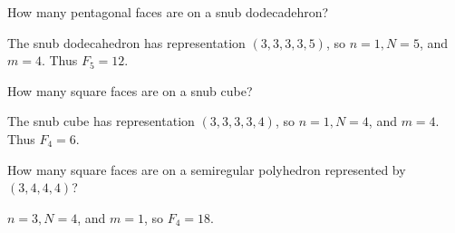 \documentclass[twoside,10pt]{article}
\begin{document}
\begin{exer}[5.17]
How many pentagonal faces are on a snub dodecadehron?
\end{exer}

The snub dodecahedron has representation $(3,3,3,3,5)$, so $n=1,N=5$, and $m=4$. Thus $F_{5} = 12$.

\begin{exer}[5.18]
How many square faces are on a snub cube?
\end{exer}

The snub cube has representation $(3,3,3,3,4)$, so $n=1,N=4$, and $m=4$. Thus $F_{4}= 6$.

\begin{exer}[5.19]
	How many square faces are on a semiregular polyhedron represented by $(3,4,4,4)$?
\end{exer}

$n=3, N=4$, and $m=1$, so $F_{4}=18$.

\newpage
\end{document}
